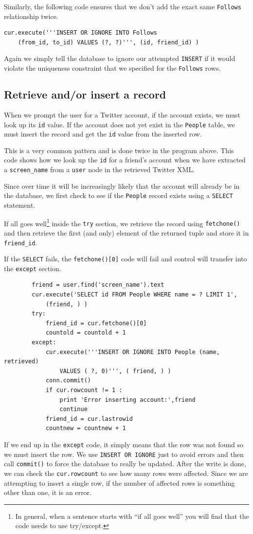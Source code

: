 \documentclass[11pt]{book}
\begin{document}
Similarly, the following code ensures that we don't add the 
exact same {\tt Follows} relationship twice.

\beforeverb
\begin{verbatim}
cur.execute('''INSERT OR IGNORE INTO Follows 
    (from_id, to_id) VALUES (?, ?)''', (id, friend_id) )
\end{verbatim}
\afterverb
%
Again we simply tell the database to ignore our attempted 
{\tt INSERT} if it would violate the uniqueness constraint
that we specified for the {\tt Follows} rows.

\subsection{Retrieve and/or insert a record}

When we prompt the user for a Twitter account, if the account 
exists, we must look up its {\tt id} value.  If the account
does not yet exist in the {\tt People} table, we must insert 
the record and get the {\tt id} value from the inserted
row.

This is a very common pattern and is done twice in the program above.
This code shows how we look up the {\tt id} for a 
friend's account when we have extracted a \verb"screen_name"
from a {\tt user} node in the retrieved Twitter XML.

Since over time it will be increasingly likely that the account
will already be in the database, we first check to see if the
{\tt People} record exists using a {\tt SELECT} statement.

If all goes well\footnote{In general, when a sentence starts 
with ``if all goes well'' you will find that the code needs
to use try/except.} inside the {\tt try} section, we retrieve the
record using {\tt fetchone()} and then retrieve the
first (and only) element of the returned tuple and store it in 
\verb"friend_id".

If the {\tt SELECT} fails, the {\tt fetchone()[0]} code will fail
and control will transfer into the {\tt except} section.

\beforeverb
\begin{verbatim}
        friend = user.find('screen_name').text
        cur.execute('SELECT id FROM People WHERE name = ? LIMIT 1',
            (friend, ) )
        try:
            friend_id = cur.fetchone()[0]
            countold = countold + 1
        except:
            cur.execute('''INSERT OR IGNORE INTO People (name, retrieved) 
                VALUES ( ?, 0)''', ( friend, ) )
            conn.commit()
            if cur.rowcount != 1 :
                print 'Error inserting account:',friend
                continue
            friend_id = cur.lastrowid
            countnew = countnew + 1
\end{verbatim}
\afterverb
%
If we end up in the {\tt except} code, it simply means that the row
was not found so we must insert the row.  We use {\tt INSERT OR 
IGNORE} just to avoid errors and then call {\tt commit()} to 
force the database to really be updated.  After the write is done, we can 
check the {\tt cur.rowcount} to see how many rows were affected.  Since
we are attempting to insert a single row, if the number of 
affected rows is something other than one, it is an error.  
\end{document}
